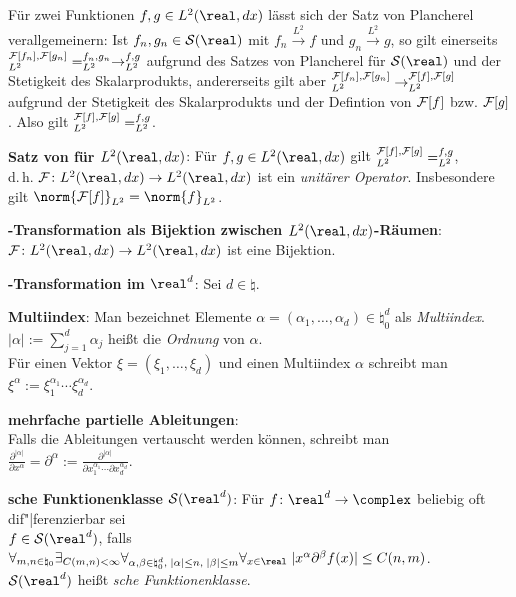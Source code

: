 \linie

Für zwei Funktionen $f, g \in L^2(\real, dx)$ lässt sich der Satz
von Plancherel verallgemeinern:
Ist $f_n, g_n \in \S(\real)$ mit $f_n \xrightarrow{L^2} f$ und
$g_n \xrightarrow{L^2} g$,
so gilt einerseits $\sp{\ensuremath{\mathcal{F}}[f_n], \ensuremath{\mathcal{F}}[g_n]}_{L^2} = \sp{f_n, g_n}_{L^2} \to
\sp{f, g}_{L^2}$
aufgrund des Satzes von Plancherel für $\S(\real)$ und der Stetigkeit des
Skalarprodukts, andererseits gilt aber
$\sp{\ensuremath{\mathcal{F}}[f_n], \ensuremath{\mathcal{F}}[g_n]}_{L^2} \to \sp{\ensuremath{\mathcal{F}}[f], \ensuremath{\mathcal{F}}[g]}_{L^2}$
aufgrund der Stetigkeit des Skalarprodukts und der Defintion von $\mathcal{F}[f]$ bzw.
$\mathcal{F}[g]$.
Also gilt $\sp{\ensuremath{\mathcal{F}}[f], \ensuremath{\mathcal{F}}[g]}_{L^2} = \sp{f, g}_{L^2}$.

\textbf{Satz von  für $L^2(\real, dx)$}:
Für $f, g \in L^2(\real, dx)$ gilt
$\sp{\ensuremath{\mathcal{F}}[f], \ensuremath{\mathcal{F}}[g]}_{L^2} = \sp{f, g}_{L^2}$,\\
d.\,h. $\F\colon L^2(\real, dx) \rightarrow L^2(\real, dx)$ ist ein
\emph{unitärer Operator}.
Insbesondere gilt $\norm{\F[f]}_{L^2} = \norm{f}_{L^2}$.

\linie

\textbf{-Transformation als Bijektion zwischen
$L^2(\real, dx)$-Räumen}:\\
$\F\colon L^2(\real, dx) \rightarrow L^2(\real, dx)$ ist eine Bijektion.

\linie
\pagebreak

\textbf{-Transformation im $\real^d$}:
Sei $d \in \natural$.

\textbf{Multiindex}:
Man bezeichnet Elemente
$\alpha = (\alpha_1, \dotsc, \alpha_d) \in \natural_0^d$
als \emph{Multiindex}.\\
$|\alpha| := \sum_{j=1}^d \alpha_j$ heißt die \emph{Ordnung} von $\alpha$.\\
Für einen Vektor $\xi = (\xi_1, \dotsc, \xi_d)$ und einen Multiindex
$\alpha$ schreibt man $\xi^\alpha := \xi_1^{\alpha_1} \dotsm \xi_d^{\alpha_d}$.

\textbf{mehrfache partielle Ableitungen}:\\
Falls die Ableitungen vertauscht werden können, schreibt man
$\frac{\partial^{|\alpha|}}{\partial x^\alpha} = \partial^\alpha :=
\frac{\partial^{|\alpha|}}{\partial x_1^{\alpha_1} \dotsm
\partial x_d^{\alpha_d}}$.

\textbf{sche Funktionenklasse $\S(\real^d)$}:
Für $f \colon \real^d \rightarrow \complex$ beliebig oft dif"|ferenzierbar
sei\\
$f \in \S(\real^d)$, falls
$\forall_{m, n \in \natural_0} \exists_{C(m, n) < \infty}
\forall_{\alpha, \beta \in \natural_0^d,\; |\alpha| \le n,\; |\beta| \le m}
\forall_{x \in \real}\; |x^\alpha \partial^\beta f(x)| \le C(n, m)$.\\
$\S(\real^d)$ heißt \emph{sche Funktionenklasse}.

